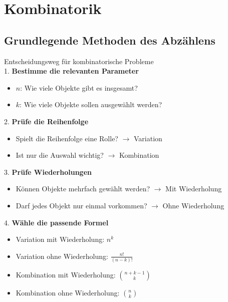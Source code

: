 
\section{Kombinatorik}

\subsection{Grundlegende Methoden des Abzählens}

\begin{KR}{Entscheidungsweg für kombinatorische Probleme}\\
1. \textbf{Bestimme die relevanten Parameter}
   \begin{itemize}
   \item $n$: Wie viele Objekte gibt es insgesamt?
   \item $k$: Wie viele Objekte sollen ausgewählt werden?
   \end{itemize}

2. \textbf{Prüfe die Reihenfolge}
   \begin{itemize}
   \item Spielt die Reihenfolge eine Rolle? $\rightarrow$ Variation
   \item Ist nur die Auswahl wichtig? $\rightarrow$ Kombination
   \end{itemize}

3. \textbf{Prüfe Wiederholungen}
   \begin{itemize}
   \item Können Objekte mehrfach gewählt werden? $\rightarrow$ Mit Wiederholung
   \item Darf jedes Objekt nur einmal vorkommen? $\rightarrow$ Ohne Wiederholung
   \end{itemize}

4. \textbf{Wähle die passende Formel}
   \begin{itemize}
   \item Variation mit Wiederholung: $n^k$
   \item Variation ohne Wiederholung: $\frac{n!}{(n-k)!}$
   \item Kombination mit Wiederholung: $\binom{n+k-1}{k}$
   \item Kombination ohne Wiederholung: $\binom{n}{k}$
   \end{itemize}
\end{KR}

